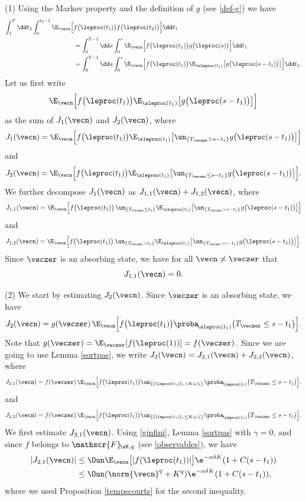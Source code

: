(1) Using the Markov property and the definition of $g$ (see \eqref{def-g}) we have
\begin{align*}
\int_{1}^{T} \dd t_{2}\int_{0}^{t_{2}-1}\E_{\vecn}\Bigl[&
f\bigl(\leproc(t_{1})\bigr) f\bigl(\leproc(t_{2})\bigr)\Bigr]\dd t_{1}\\
& =\int_{0}^{T-1} \dd s\int_{0}^{s}\E_{\vecn}\Bigl[
f\bigl(\leproc(t_{1})\bigr) g\bigl(\leproc(s)\bigr)\Bigr]\dd t_{1}\\
& = \int_{0}^{T-1} \dd s\int_{0}^{s}
\E_{\vecn}\Bigl[f\bigl(\leproc(t_{1})\bigr) \E_{\sleproc(t_{1}) } \bigl[g\bigl(\leproc(s-t_1)\bigr)\bigr]\Bigr]\dd t_{1}.
\end{align*}
Let us first write
\[
\E_{\vecn}\Bigl[f\bigl(\leproc(t_{1})\bigr) \E_{\sleproc(t_{1}) } \bigl[g\bigl(\leproc(s-t_1)\bigr)\bigr]\Bigr]
\]
as the sum of $J_{1}(\vecn)$ and $J_{2}(\vecn)$, where
\[
J_1(\vecn)=\E_{\vecn}\Bigl[f\bigl(\leproc(t_{1})\bigr)\E_{\sleproc(t_{1}) } \bigl[\un_{\{T_{\veczer} >s-t_1\}}g\bigl(\leproc(s-t_1)\bigr)\bigr]\Bigr]
\]
and
\[
J_2(\vecn)=\E_{\vecn}\Bigl[
f\bigl(\leproc(t_{1})\bigr) \E_{\sleproc(t_{1}) } \bigl[
\un_{\{T_{\veczer} \leq s-t_1\}}g\bigl(\leproc(s-t_1)\bigr)\bigr]\Bigr].
\]
We further decompose $J_1(\vecn)$ as $J_{1,1}(\vecn)+J_{1,2}(\vecn)$, where
\[
J_{1,1}(\vecn)=\E_{\vecn}\Bigl[
f\bigl(\leproc(t_{1})\bigr) \,\un_{\{T_{\veczer}\leq t_1\}}
\E_{\sleproc(t_{1}) }
\bigl[\un_{\{T_{\veczer} >s-t_1\}}g\bigl(\leproc(s-t_1)\bigr)\bigr]\Bigr]
\]
and
\[
J_{1,2}(\vecn)=\E_{\vecn}\Bigl[
f\bigl(\leproc(t_{1})\bigr)\,\un_{\{T_{\veczer}> t_1\}}
\E_{\sleproc(t_{1}) } \bigl[\un_{\{T_{\veczer} >s-t_1\}}g\bigl(\leproc(s-t_1)\bigr)\bigr]\Bigr].
\]
Since $\veczer$ is an absorbing state, we have for all $\vecn\neq \veczer$ that
\[
J_{1,1}(\vecn)=0.
\]

(2) We start by estimating $J_2(\vecn)$.
Since $\veczer$ is an absorbing state, we have
\[
J_2(\vecn)= g(\veczer)\, \E_{\vecn}\Bigl[
f\bigl(\leproc(t_{1})\bigr)\proba_{\!\sleproc(t_{1}) } \bigl(
T_{\veczer} \leq s-t_1\bigr)\Bigr].
\]
Note that $g(\veczer)= \E_{\veczer}[f(\leproc(1))]= f(\veczer)$.
Since we are going to use Lemma \ref{sortpas}, we write $J_2(\vecn)=J_{2,1}(\vecn)+J_{2,2}(\vecn)$,
where
\[
J_{2,1}(\vecn)=
f(\veczer)\,\E_{\vecn}\Bigl[
f\bigl(\leproc(t_{1})\bigr) \un_{\{\|\leproc(t_1)\|_1> K\alpha/\zeta\}} \proba_{\!\leproc(t_{1}) } \bigl(
T_{\veczer} \leq s-t_1\bigr)\Bigr].
\]
and
\[
J_{2,2}(\vecn)= f(\veczer)\,
\E_{\vecn}\Bigl[
f\bigl(\leproc(t_{1})\bigr) \un_{\{\|\leproc(t_1)\|_1\leq K\alpha/\zeta\}} \proba_{\!\leproc(t_{1}) } \bigl(
T_{\veczer} \leq s-t_1\bigr)\Bigr].
\]
We first estimate $J_{2,1}(\vecn)$.
Using \eqref{ginfini}, Lemma \ref{sortpas} with $\gamma=0$,
and since $f$ belongs to $\mathscr{F}\!_{\sK,q}$ (see \eqref{observables}), we have
\begin{align*}
|J_{2,1}(\vecn)|
& \leq \Oun \E_{\vecn}\bigl[|f(\leproc(t_1))|\bigr] \e^{- \alpha \delta K}(1+C {(s-t_1)})\\
& \leq \Oun (\norm{\vecn}^{q} + K^q) \e^{- \alpha \delta K}(1+C {(s-t_1)}),
\end{align*}
where we used Proposition \ref{tempscourts} for the second inequality.

